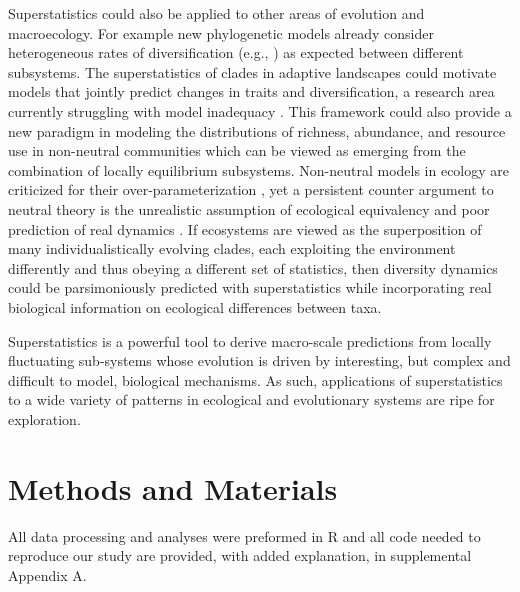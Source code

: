 \documentclass[12pt]{article}
\let\citep=\cite
\begin{document}
Superstatistics could also be applied to other areas of evolution and
macroecology.  For example new phylogenetic models already consider
heterogeneous rates of diversification (e.g., \citep{rabosky2014}) as
expected between different subsystems. The superstatistics of clades
in adaptive landscapes could motivate models that jointly predict
changes in traits and diversification, a research area currently
struggling with model inadequacy \citep{rabosky2017fisse}. This
framework could also provide a new paradigm in modeling the
distributions of richness, abundance, and resource use in non-neutral
communities which can be viewed as emerging from the combination of
locally equilibrium subsystems. Non-neutral models in ecology are
criticized for their over-parameterization \citep{rosindell2011}, yet
a persistent counter argument to neutral theory \citep{hubbell2001} is
the unrealistic assumption of ecological equivalency
\citep{chave2004neutral} and poor prediction of real dynamics
\citep{ricklefs2006neutral}. If ecosystems are viewed as the
superposition of many individualistically evolving clades, each
exploiting the environment differently and thus obeying a different
set of statistics, then diversity dynamics could be parsimoniously
predicted with superstatistics while incorporating real biological
information on ecological differences between taxa.

Superstatistics is a powerful tool to derive macro-scale predictions
from locally fluctuating sub-systems whose evolution is driven by
interesting, but complex and difficult to model, biological
mechanisms. As such, applications of superstatistics to a wide variety
of patterns in ecological and evolutionary systems are ripe for
exploration.


\section{Methods and Materials}

All data processing and analyses were preformed in R \citep{rcite} and
all code needed to reproduce our study are provided, with added
explanation, in supplemental Appendix A.
\end{document}
